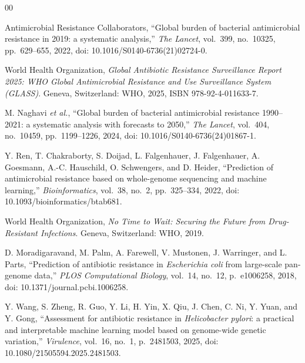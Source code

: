 \documentclass[conference]{IEEEtran}
\begin{document}
\balance
\begin{thebibliography}{00}

 Antimicrobial Resistance Collaborators, ``Global burden of bacterial antimicrobial resistance in 2019: a systematic analysis,'' \textit{The Lancet}, vol.~399, no.~10325, pp.~629--655, 2022, doi: 10.1016/S0140-6736(21)02724-0.

 World Health Organization, \textit{Global Antibiotic Resistance Surveillance Report 2025: WHO Global Antimicrobial Resistance and Use Surveillance System (GLASS)}. Geneva, Switzerland: WHO, 2025, ISBN 978-92-4-011633-7.

 M. Naghavi \textit{et al.}, ``Global burden of bacterial antimicrobial resistance 1990--2021: a systematic analysis with forecasts to 2050,'' \textit{The Lancet}, vol.~404, no.~10459, pp.~1199--1226, 2024, doi: 10.1016/S0140-6736(24)01867-1.

 Y. Ren, T. Chakraborty, S. Doijad, L. Falgenhauer, J. Falgenhauer, A. Goesmann, A.-C. Hauschild, O. Schwengers, and D. Heider, ``Prediction of antimicrobial resistance based on whole-genome sequencing and machine learning,'' \textit{Bioinformatics}, vol.~38, no.~2, pp.~325--334, 2022, doi: 10.1093/bioinformatics/btab681.

 World Health Organization, \textit{No Time to Wait: Securing the Future from Drug-Resistant Infections}. Geneva, Switzerland: WHO, 2019.

 D. Moradigaravand, M. Palm, A. Farewell, V. Mustonen, J. Warringer, and L. Parts, ``Prediction of antibiotic resistance in \textit{Escherichia coli} from large-scale pan-genome data,'' \textit{PLOS Computational Biology}, vol.~14, no.~12, p.~e1006258, 2018, doi: 10.1371/journal.pcbi.1006258.

 Y. Wang, S. Zheng, R. Guo, Y. Li, H. Yin, X. Qiu, J. Chen, C. Ni, Y. Yuan, and Y. Gong, ``Assessment for antibiotic resistance in \textit{Helicobacter pylori}: a practical and interpretable machine learning model based on genome-wide genetic variation,'' \textit{Virulence}, vol.~16, no.~1, p.~2481503, 2025, doi: 10.1080/21505594.2025.2481503.


\end{thebibliography}
\end{document}
